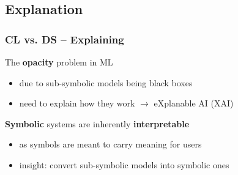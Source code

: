 \documentclass[presentation]{beamer}\mode<presentation>{\usetheme{AMSBolognaFC}}
\begin{document}
\subsection{Explanation}

\begin{frame}%
    \frametitle{CL vs. DS -- Explaining}

    \begin{block}{The \textbf{opacity} problem in ML}
        \begin{itemize}
            \item due to sub-symbolic models being \alert{black boxes}
            \item need to \alert{explain} how they work $\rightarrow$ \alert{eXplanable AI} (XAI)
        \end{itemize}
    \end{block}

    \begin{alertblock}{\textbf{Symbolic} systems are inherently \textbf{interpretable}}
        \begin{itemize}
            \item as \alert{symbols} are meant to \alert{carry meaning} for users
            \item insight: \alert{convert} sub-symbolic models into symbolic ones
        \end{itemize}
    \end{alertblock}
\end{frame}
\end{document}
